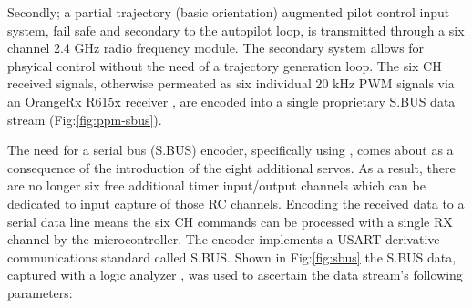 \par
Secondly; a partial trajectory (basic orientation) augmented pilot control input system, fail safe and secondary to the autopilot loop, is transmitted through a six channel 2.4 GHz radio frequency module. The secondary system allows for phsyical control without the need of a trajectory generation loop. The six CH received signals, otherwise permeated as six individual 20 kHz PWM signals via an OrangeRx R615x receiver \cite{r615x}, are encoded into a single proprietary S.BUS data stream (Fig:\ref{fig:ppm-sbus}). 
\par
The need for a serial bus (S.BUS) encoder, specifically using \cite{sbusencoder}, comes about as a consequence of the introduction of the eight additional servos. As a result, there are no longer six free additional timer input/output channels which can be dedicated to input capture of those RC channels. Encoding the received data to a serial data line means the six CH commands can be processed with a single RX channel by the microcontroller. The encoder implements a USART derivative communications standard called S.BUS. Shown in Fig:\ref{fig:sbus} the S.BUS data, captured with a logic analyzer \cite{saleae}, was used to ascertain the data stream's following parameters:
\par
